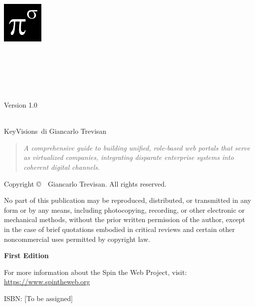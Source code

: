 \begin{titlepage}
\centering

\includegraphics[width=0.15\textwidth]{figures/logo.png}\\[1cm]

\vspace*{1cm}

\makeatletter
{\Huge\bfseries \@title\\[0.5cm]}

\ifx\@subtitle\@empty\else
{\Large \@subtitle\\[1.5cm]}
\fi

{\large\textsc{\@author}\\[2cm]}

{\large Version 1.0\\[0.5cm]}
{\large \@date\\[2cm]}
\makeatother

\vfill

{\large KeyVisions\texttrademark\ di Giancarlo Trevisan\\[0.5cm]}

\begin{quote}
\centering
\textit{A comprehensive guide to building unified, role-based web portals that serve as virtualized companies, integrating disparate enterprise systems into coherent digital channels.}
\end{quote}

\end{titlepage}

\thispagestyle{empty}
\null\vfill
\noindent
\thispagestyle{empty}
\vspace*{\fill}
\begin{center}
\small
Copyright \copyright\ \the\year\ Giancarlo Trevisan. All rights reserved.

\medskip

\noindent
No part of this publication may be reproduced, distributed, or transmitted in any form or by any means, including photocopying, recording, or other electronic or mechanical methods, without the prior written permission of the author, except in the case of brief quotations embodied in critical reviews and certain other noncommercial uses permitted by copyright law.

\medskip

\noindent
\textbf{First Edition}

\medskip

\noindent
For more information about the Spin the Web Project, visit: \\
\url{https://www.spintheweb.org}

\medskip

\noindent
ISBN: [To be assigned]
\end{center}

\clearpage
